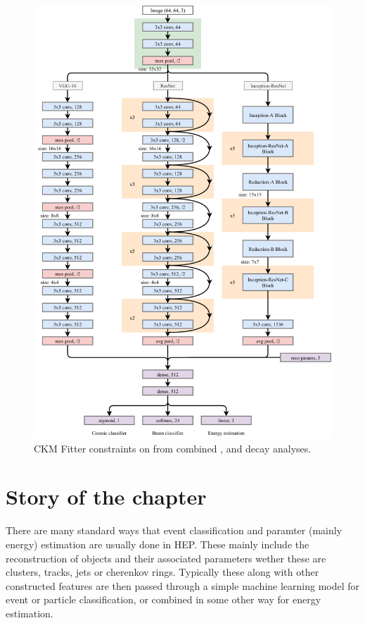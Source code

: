 \begin{figure}
    \includegraphics[width=\textwidth]{diagrams/6-cvn/chipsnet.pdf}
    \caption[CKM Fitter constraints on \alphaCKM.]%
    {CKM Fitter constraints on \alphaCKM from combined \BToPiPi,
        \BToRhoPi and \BToRhoRho decay analyses.}
    \label{fig:chipsnet}
\end{figure}



\section{Story of the chapter}

There are many standard ways that event classification and paramter (mainly energy) estimation are
usually done in HEP. These mainly include the reconstruction of objects and their associated parameters
wether these are clusters, tracks, jets or cherenkov rings. Typically these along with other constructed
features are then passed through a simple machine learning model for event or particle classification, or
combined in some other way for energy estimation.

